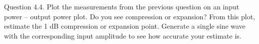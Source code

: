 \begin{Task}{Question 4.4.}
    Plot the measurements from the previous question on an input power – output power plot. Do you see compression or expansion? From this plot, estimate the 1 dB compression or expansion point. Generate a single sine wave with the corresponding input amplitude to see how accurate your estimate is.
\end{Task}

